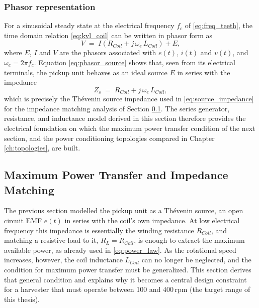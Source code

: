 \subsubsection*{Phasor representation}

For a sinusoidal steady state at the electrical frequency $f_c$ of \eqref{eq:freq_teeth}, the time domain relation \eqref{eq:kvl_coil} can be written in phasor form as
\begin{equation}
    V \;=\; I\left(R_{Coil} + j\,\omega_e\,L_{Coil}\right) + E,
    \label{eq:phasor_source}
\end{equation}
where $E$, $I$ and $V$ are the phasors associated with $e(t)$, $i(t)$ and $v(t)$, and $\omega_e = 2\pi f_c$. Equation \eqref{eq:phasor_source} shows that, seen from its electrical terminals, the pickup unit behaves as an ideal source $E$ in series with the impedance
\begin{equation}
    Z_s \;=\; R_{Coil} + j\,\omega_e\,L_{Coil},
    \label{eq:source_impedance_def}
\end{equation}
which is precisely the Th\'{e}venin source impedance used in \eqref{eq:source_impedance} for the impedance matching analysis of Section \ref{sec:impedance_matching}. The series generator, resistance, and inductance model derived in this section therefore provides the electrical foundation on which the maximum power transfer condition of the next section, and the power conditioning topologies compared in Chapter \ref{ch:topologies}, are built.


\subsection{Maximum Power Transfer and Impedance Matching}
\label{sec:impedance_matching}

The previous section modelled the pickup unit as a Th\'{e}venin source, an open circuit EMF $e(t)$ in series with the coil's own impedance. At low electrical frequency this impedance is essentially the winding resistance $R_{Coil}$, and matching a resistive load to it, $R_L = R_{Coil}$, is enough to extract the maximum available power, as already used in \eqref{eq:power_law}. As the rotational speed increases, however, the coil inductance $L_{Coil}$ can no longer be neglected, and the condition for maximum power transfer must be generalized. This section derives that general condition and explains why it becomes a central design constraint for a harvester that must operate between 100 and 400\,rpm (the target range of this thesis).

